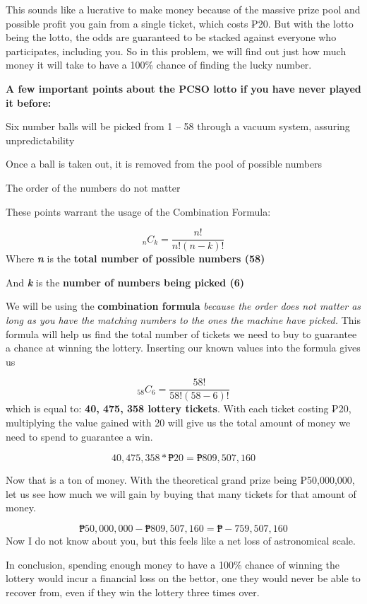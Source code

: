 \documentclass[
]{article}
\begin{document}
This sounds like a lucrative to make money because of the massive prize
pool and possible profit you gain from a single ticket, which costs ₱20.
But with the lotto being the lotto, the odds are guaranteed to be
stacked against everyone who participates, including you. So in this
problem, we will find out just how much money it will take to have a
100\% chance of finding the lucky number.

\textbf{A few important points about the PCSO lotto if you have never
played it before:}

Six number balls will be picked from 1 -- 58 through a vacuum system,
assuring unpredictability

Once a ball is taken out, it is removed from the pool of possible
numbers

The order of the numbers do not matter

These points warrant the usage of the Combination Formula:

\[ _{n}C_{k}= \frac{n!}{n!(n-k)!} \] Where \textbf{\emph{n}} is the
\textbf{total number of possible numbers (58)}

And \textbf{\emph{k}} is the \textbf{number of numbers being picked (6)}

We will be using the \textbf{combination formula} \emph{because the
order does not matter as long as you have the matching numbers to the
ones the machine have picked.} This formula will help us find the total
number of tickets we need to buy to guarantee a chance at winning the
lottery. Inserting our known values into the formula gives us

\[ _{58}C_{6}= \frac{58!}{58!(58-6)!} \] which is equal to: \textbf{40,
475, 358 lottery tickets}. With each ticket costing ₱20, multiplying the
value gained with 20 will give us the total amount of money we need to
spend to guarantee a win.

\[ 40, 475, 358*₱20 = ₱809,507,160\]

Now that is a ton of money. With the theoretical grand prize being
₱50,000,000, let us see how much we will gain by buying that many
tickets for that amount of money.

\[ ₱50,000,000 - ₱809,507,160 = ₱-759,507,160 \] Now I do not know about
you, but this feels like a net loss of astronomical scale.

In conclusion, spending enough money to have a 100\% chance of winning
the lottery would incur a financial loss on the bettor, one they would
never be able to recover from, even if they win the lottery three times
over.
\end{document}
